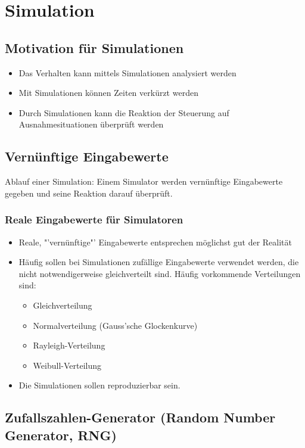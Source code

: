 \section{Simulation}

\subsection{Motivation für Simulationen}
\begin{itemize}
	\item Das Verhalten kann mittels Simulationen analysiert werden
	\item Mit Simulationen können Zeiten verkürzt werden
	\item Durch Simulationen kann die Reaktion der Steuerung auf Ausnahmesituationen überprüft werden
\end{itemize}

\subsection{Vernünftige Eingabewerte}
Ablauf einer Simulation: Einem Simulator werden vernünftige Eingabewerte gegeben und seine Reaktion darauf überprüft.
\subsubsection{Reale Eingabewerte für Simulatoren}
\begin{itemize}
	\item Reale, "'vernünftige"' Eingabewerte entsprechen möglichst gut der Realität
	\item Häufig sollen bei Simulationen zufällige Eingabewerte verwendet werden, die nicht notwendigerweise gleichverteilt sind. Häufig vorkommende Verteilungen sind:
	  \begin{itemize}
	    \item Gleichverteilung
		\item Normalverteilung (Gauss'sche Glockenkurve)
		\item Rayleigh-Verteilung
		\item Weibull-Verteilung
	  \end{itemize}
	\item Die Simulationen sollen reproduzierbar sein.
\end{itemize}

\subsection{Zufallszahlen-Generator (Random Number Generator, RNG)}
